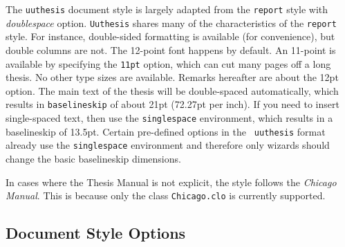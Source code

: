 The \verb|uuthesis| document style is largely adapted from the
\verb|report| style with {\em doublespace} option. \verb|Uuthesis|
shares many of the characteristics of the \verb|report| style. For
instance, double-sided formatting is available (for convenience), but
double columns are not. The 12-point font happens by default.
An 11-point is available by specifying the \verb|11pt| option, which can
cut many pages off a long thesis. No other type sizes are available.
Remarks hereafter are about the 12pt option. The main text of the thesis
will be double-spaced automatically, which results in {\tt baselineskip}
of about 21pt (72.27pt per inch). If you need to insert single-spaced
text, then use the {\tt singlespace} environment, which results in a
baselineskip of 13.5pt. Certain pre-defined options in the {\tt
uuthesis} format already use the {\tt singlespace} environment and
therefore only wizards should change the basic baselineskip dimensions.

In cases where the Thesis Manual is not explicit, the style follows
the {\em Chicago Manual}. This is because only the class {\tt Chicago.clo}
is currently supported.

\subsection{Document Style Options}

